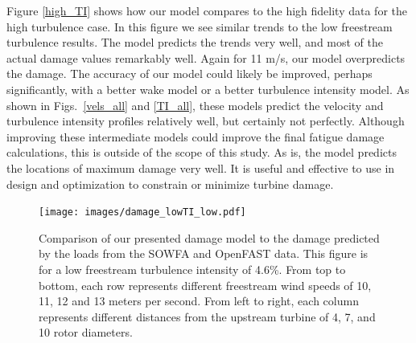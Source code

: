 \documentclass[11pt,letterpaper]{article}
\begin{document}
Figure \ref{high_TI} shows how our model compares to the high fidelity data for the high turbulence case. In this figure we see similar trends to the low freestream turbulence results. The model predicts the trends very well, and most of the actual damage values remarkably well. Again for 11 m/s, our model overpredicts the damage. The accuracy of our model could likely be improved, perhaps significantly, with a better wake model or a better turbulence intensity model. As shown in Figs.~\ref{vels_all} and \ref{TI_all}, these models predict the velocity and turbulence intensity profiles relatively well, but certainly not perfectly. Although improving these intermediate models could improve the final fatigue damage calculations, this is outside of the scope of this study. As is, the model predicts the locations of maximum damage very well. It is useful and effective to use in design and optimization to constrain or minimize turbine damage.
% 
\begin{figure}
    \centering
    \texttt{[image: images/damage\_lowTI\_low.pdf]}
    \caption{Comparison of our presented damage model to the damage predicted by the loads from the SOWFA and OpenFAST data. This figure is for a low freestream turbulence intensity of 4.6\%. From top to bottom, each row represents different freestream wind speeds of 10, 11, 12 and 13 meters per second. From left to right, each column represents different distances from the upstream turbine of 4, 7, and 10 rotor diameters.}
    \label{low_TI}
\end{figure}
\end{document}
